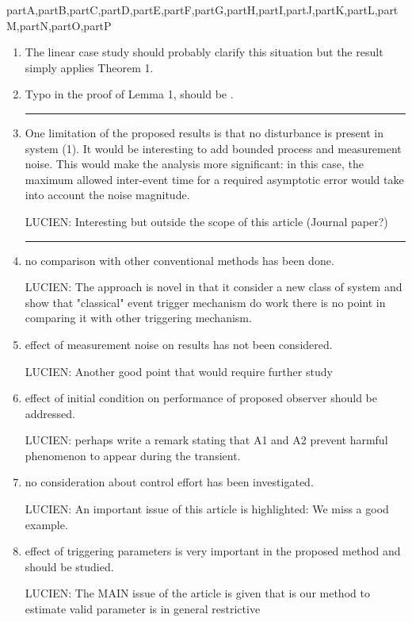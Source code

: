 \documentclass[letterpaper, 10 pt, conference]{ieeeconf}
\def\compile{partA,partB,partC,partD,partE,partF,partG,partH,partI,partJ,partK,partL,partM,partN,partO,partP}
\begin{document}
\begin{xcomment}{\compile}
\begin{partQ}
\begin{enumerate}
\item The linear case study should probably clarify this situation but the result simply applies Theorem 1.



\item Typo in the proof of Lemma 1,  should be .

\medskip\hrule\medskip

\item One limitation of the proposed results is that no disturbance is present in system (1). It would be interesting to add bounded process and measurement noise.
This would make the analysis more significant: in this case, the maximum allowed inter-event time for a required asymptotic error would take into account the noise magnitude.

LUCIEN: Interesting but outside the scope of this article (Journal paper?)


\medskip\hrule\medskip

\item no comparison with other conventional methods has been done.

LUCIEN: The approach is novel in that it consider a new class of system and show that "classical" event trigger mechanism do work there is no point in comparing it with other triggering mechanism.

\item effect of measurement noise on results has not been considered.

LUCIEN: Another good point that would require further study

\item effect of initial condition on performance of proposed observer should be addressed.

LUCIEN: perhaps write a remark stating that A1 and A2 prevent harmful phenomenon to appear during the transient.

\item no consideration about control effort has been investigated.

LUCIEN: An important issue of this article is highlighted: We miss a good example.

\item effect of triggering parameters is very important in the proposed method and should be studied.

LUCIEN: The MAIN issue of the article is given that is our method to estimate valid parameter is in general restrictive 


\end{enumerate}



\end{partQ}


\end{xcomment}
                                                                
\end{document}
